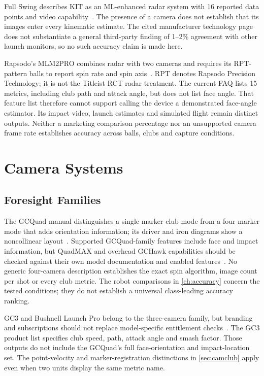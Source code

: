 Full Swing describes KIT as an ML-enhanced radar system with 16 reported data points and video capability~\cite{fullswingkit}.
The presence of a camera does not establish that its images enter every kinematic estimate.
The cited manufacturer technology page does not substantiate a general third-party finding of 1--2\% agreement with other launch monitors, so no such accuracy claim is made here.

Rapsodo's MLM2PRO combines radar with two cameras and requires its RPT-pattern balls to report spin rate and spin axis~\cite{rapsodofaq,rapsodomlm2prorpt}.
RPT denotes Rapsodo Precision Technology; it is not the Titleist RCT radar treatment.
The current FAQ lists 15 metrics, including club path and attack angle, but does not list face angle.
That feature list therefore cannot support calling the device a demonstrated face-angle estimator.
Its impact video, launch estimates and simulated flight remain distinct outputs.
Neither a marketing comparison percentage nor an unsupported camera frame rate establishes accuracy across balls, clubs and capture conditions.

\section{Camera Systems}

\subsection{Foresight Families}

The GCQuad manual distinguishes a single-marker club mode from a four-marker mode that adds orientation information; its driver and iron diagrams show a noncollinear layout~\cite{foresightquadmanual}.
Supported GCQuad-family features include face and impact information, but QuadMAX and overhead GCHawk capabilities should be checked against their own model documentation and enabled features~\cite{foresightmarkers}.
No generic four-camera description establishes the exact spin algorithm, image count per shot or every club metric.
The robot comparisons in \cref{ch:accuracy} concern the tested conditions; they do not establish a universal class-leading accuracy ranking.

GC3 and Bushnell Launch Pro belong to the three-camera family, but branding and subscriptions should not replace model-specific entitlement checks~\cite{foresightgc3,bushnelllaunchpro}.
The GC3 product list specifies club speed, path, attack angle and smash factor.
Those outputs do not include the GCQuad's full face-orientation and impact-location set.
The point-velocity and marker-registration distinctions in \cref{sec:camclub} apply even when two units display the same metric name.

